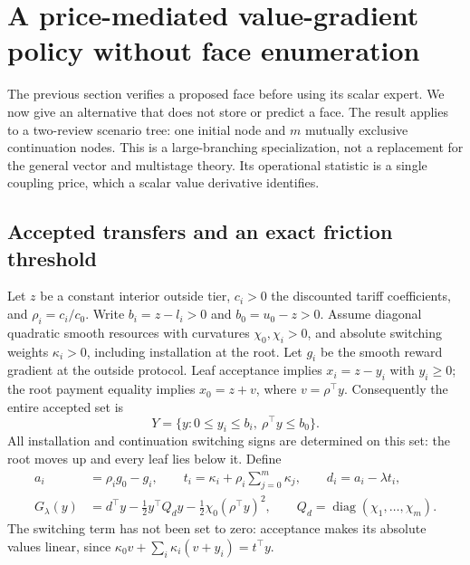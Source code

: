 \documentclass[11pt,letterpaper]{article}
\theoremstyle{definition}
\newcommand{\1}{\mathbf 1}
\begin{document}


\section{A price-mediated value-gradient policy without face enumeration}\label{sec:r14-star}
The previous section verifies a proposed face before using its scalar expert. We now give an alternative that does not store or predict a face. The result applies to a two-review scenario tree: one initial node and $m$ mutually exclusive continuation nodes. This is a large-branching specialization, not a replacement for the general vector and multistage theory. Its operational statistic is a single coupling price, which a scalar value derivative identifies.

\subsection{Accepted transfers and an exact friction threshold}
Let $z$ be a constant interior outside tier, $c_i>0$ the discounted tariff coefficients, and $\rho_i=c_i/c_0$. Write $b_i=z-l_i>0$ and $b_0=u_0-z>0$. Assume diagonal quadratic smooth resources with curvatures $\chi_0,\chi_i>0$, and absolute switching weights $\kappa_i>0$, including installation at the root. Let $g_i$ be the smooth reward gradient at the outside protocol. Leaf acceptance implies $x_i=z-y_i$ with $y_i\geq0$; the root payment equality implies $x_0=z+v$, where $v=\rho^\top y$. Consequently the entire accepted set is
\begin{equation}\label{eq:r14-Y}
 Y=\{y:0\leq y_i\leq b_i,\ \rho^\top y\leq b_0\}.
\end{equation}
All installation and continuation switching signs are determined on this set: the root moves up and every leaf lies below it. Define
\begin{equation}\label{eq:r14-objective}
 \begin{split}
 a_i&=\rho_i g_0-g_i,\qquad
 t_i=\kappa_i+\rho_i\sum_{j=0}^m\kappa_j,\qquad d_i=a_i-\lambda t_i,\\
 G_\lambda(y)&=d^\top y-\tfrac12 y^\top Q_dy-\tfrac12\chi_0(\rho^\top y)^2,
 \qquad Q_d=\operatorname{diag}(\chi_1,\ldots,\chi_m).
 \end{split}
\end{equation}
The switching term has not been set to zero: acceptance makes its absolute values linear, since $\kappa_0v+\sum_i\kappa_i(v+y_i)=t^\top y$.
\end{document}
